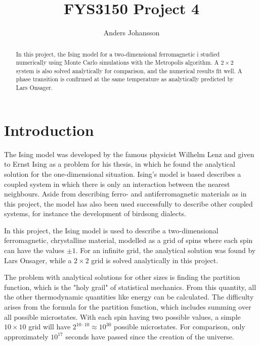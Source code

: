 \documentclass[12pt,english,a4paper]{article}
\title{FYS3150 Project 4}
\author{Anders Johansson}
\begin{document}
%
\maketitle
\pagestyle{fancy}
\tableofcontents

\begin{abstract}
In this project, the Ising model for a two-dimensional ferromagnetic i studied numerically using Monte Carlo simulations with the Metropolis algorithm. A \(2\times2\) system is also solved analytically for comparison, and the numerical results fit well. A phase transition is confirmed at the same temperature as analytically predicted by Lars Onsager.
\end{abstract}
\clearpage


\section{Introduction}
The Ising model was developed by the famous physicist Wilhelm Lenz and given to Ernst Ising as a problem for his thesis, in which he found the analytical solution for the one-dimensional situation. Ising's model is based describes a coupled system in which there is only an interaction between the nearest neighbours. Aside from describing ferro- and antiferromagnetic materials as in this project, the model has also been used successfully to describe other coupled systems, for instance the development of birdsong dialects\autocite{birdsong}.

In this project, the Ising model is used to describe a two-dimensional ferromagnetic, chrystalline material, modelled as a grid of spins where each spin can have the values \(\pm1\). For an infinite grid, the analytical solution was found by Lars Onsager, while a \(2\times2\) grid is solved analytically in this project.

The problem with analytical solutions for other sizes is finding the partition function, which is the "holy grail" of statistical mechanics. From this quantity, all the other thermodynamic quantities like energy can be calculated. The difficulty arises from the formula for the partition function, which includes summing over all possible microstates. With each spin having two possible values, a simple \(10\times10\) grid will have \(2^{10\cdot10}\approx10^{30}\) possible microstates. For comparison, only approximately \(10^{17}\) seconds have passed since the creation of the universe.
\end{document}
